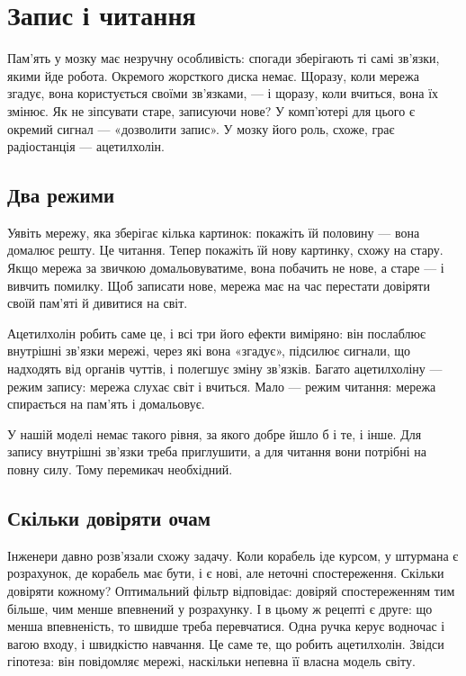 \chapter{Запис і читання}

Пам'ять у мозку має незручну особливість: спогади зберігають ті самі зв'язки, якими йде робота. Окремого жорсткого диска немає. Щоразу, коли мережа згадує, вона користується своїми зв'язками, --- і щоразу, коли вчиться, вона їх змінює. Як не зіпсувати старе, записуючи нове? У комп'ютері для цього є окремий сигнал --- «дозволити запис». У мозку його роль, схоже, грає радіостанція  --- ацетилхолін.

\section*{Два режими}

Уявіть мережу, яка зберігає кілька картинок: покажіть їй половину --- вона домалює решту. Це читання. Тепер покажіть їй нову картинку, схожу на стару. Якщо мережа за звичкою домальовуватиме, вона побачить не нове, а старе --- і вивчить помилку. Щоб записати нове, мережа має на час перестати довіряти своїй пам'яті й дивитися на світ.


Ацетилхолін робить саме це, і всі три його ефекти виміряно: він послаблює внутрішні зв'язки мережі, через які вона «згадує», підсилює сигнали, що надходять від органів чуттів, і полегшує зміну зв'язків. Багато ацетилхоліну --- режим запису: мережа слухає світ і вчиться. Мало --- режим читання: мережа спирається на пам'ять і домальовує.

У нашій моделі немає такого рівня, за якого добре йшло б і те, і інше. Для запису внутрішні зв'язки треба приглушити, а для читання вони потрібні на повну силу. Тому перемикач необхідний.

\section*{Скільки довіряти очам}

Інженери давно розв'язали схожу задачу. Коли корабель іде курсом, у штурмана є розрахунок, де корабель має бути, і є нові, але неточні спостереження. Скільки довіряти кожному? Оптимальний фільтр відповідає: довіряй спостереженням тим більше, чим менше впевнений у розрахунку. І в цьому ж рецепті є друге: що менша впевненість, то швидше треба перевчатися. Одна ручка керує водночас і вагою входу, і швидкістю навчання. Це саме те, що робить ацетилхолін. Звідси гіпотеза: він повідомляє мережі, наскільки непевна її власна модель світу.

